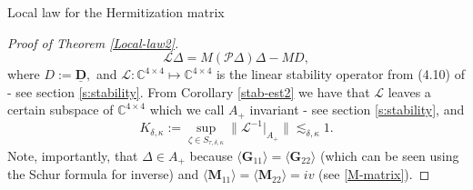\documentclass[11pt, a4paper, oneside]{book}
\numberwithin{equation}{chapter}
\newcommand{\beq}{\begin{equation}}
\newcommand{\eeq}{\end{equation}}
\begin{document}
\begin{section}{Local law for the Hermitization matrix}
\begin{proof}[Proof of Theorem \ref{Local-law2}]
%
\beq \label{Delta-44}
\mathscr{L} \Delta = M (\mathscr{P} \Delta) \Delta - M D,
\eeq
where $D:= \underline{\mathbf{D}},$ and $\mathscr{L}:\mathbb{C}^{4 \times 4} \mapsto \mathbb{C}^{4 \times 4}$ is the linear stability operator from (4.10) of \cite{alt2022local} - see section \ref{s:stability}. From Corollary \ref{stab-est2} we have that $\mathscr{L}$ leaves a certain subspace of $\mathbb{C}^{4\times 4}$ which we call $ A_+$ invariant - see section \ref{s:stability}, and
%
\beq \label{kappa}
K_{\delta, \kappa} := \sup_{\zeta \in {S}_{\tau,\delta, \kappa}}\|\mathscr{L}^{-1}|_{A_+} \| \lesssim_{\delta, \kappa} 1.
\eeq
%
Note, importantly, that $\Delta \in A_+$ because $\langle \mathbf{G}_{11} \rangle = \langle \mathbf{G}_{22} \rangle  $ (which can be seen using the Schur formula for inverse) and $\langle \mathbf{M}_{11} \rangle = \langle \mathbf{M}_{22} \rangle = iv$ (see \eqref{M-matrix}).


\end{proof}
\end{section}
\end{document}
